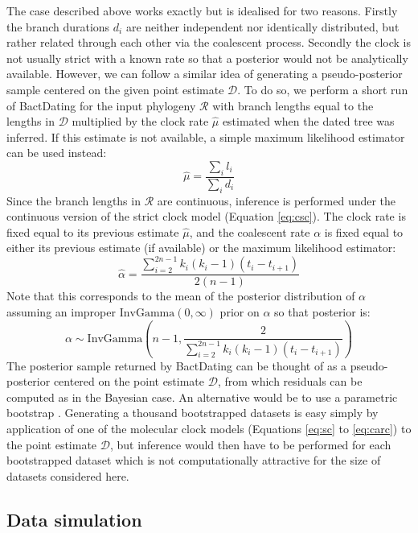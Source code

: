 \documentclass{article}
\begin{document}
The case described above works exactly but is idealised for two reasons.
Firstly the branch durations $d_i$ are neither independent nor identically distributed,
but rather related through each other via the coalescent process. Secondly
the clock is not usually strict with a known rate so that
a posterior would not be analytically available. 
However, we can follow
a similar idea of generating a pseudo-posterior sample centered on the given
point estimate $\mathcal{D}$. To do so, we perform a short run of BactDating \citep{Didelot2018}
for the input phylogeny $\mathcal{R}$ 
with branch lengths equal to
the lengths in $\mathcal{D}$ multiplied by the clock rate 
$\hat \mu$ estimated when the dated tree was inferred. 
If this estimate is not available, a simple maximum likelihood
estimator can be used instead: 
\begin{equation}
\hat \mu = \frac{\sum_i l_i}{\sum_i d_i}
\end{equation}
Since the branch lengths in $\mathcal{R}$ are continuous, 
inference is performed under the 
continuous version of the strict clock model (Equation \ref{eq:csc}).  
The clock rate is fixed equal to its previous estimate $\hat \mu$, and the coalescent rate $\alpha$
is fixed equal to either its previous estimate (if available) or
the maximum likelihood estimator:
\begin{equation}
\hat \alpha = \frac{\sum_{i=2}^{2n-1}k_i (k_i-1)(t_i-t_{i+1})}{2(n-1)}
\end{equation}
Note that this corresponds to the mean of the posterior distribution of $\alpha$ 
assuming an improper $\mathrm{InvGamma}(0,\infty)$ prior on $\alpha$ so that posterior is:
\begin{equation}
\alpha \sim \mathrm{InvGamma}\left(n-1, \frac{2}{\sum_{i=2}^{2n-1}k_i (k_i-1)(t_i-t_{i+1})}\right)
\end{equation}
The posterior sample returned by BactDating can be thought of as a pseudo-posterior centered
on the point estimate $\mathcal{D}$, from which residuals can be computed as in the Bayesian case.
An alternative would be to use a 
parametric bootstrap \citep{efronBayesianInferenceParametric2012}. Generating a thousand bootstrapped
datasets is easy simply by application of one of the molecular clock models (Equations
\ref{eq:sc} to \ref{eq:carc}) to the point estimate $\mathcal{D}$, but inference would then have
to be performed for each bootstrapped dataset which is not computationally
attractive for the size of datasets considered here. 

\subsection*{Data simulation}
\end{document}
